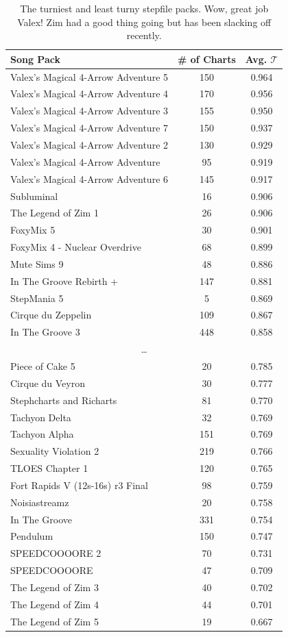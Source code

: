 \documentclass[10pt]{sigplanconf}
\begin{document}
\begin{table}[t]
	\begin{center}
		\small
	\begin{tabular}{l|c|c}
		Song Pack & \# of Charts & Avg. $\mathcal{T}$ \\
		\hline
		Valex's Magical 4-Arrow Adventure 5 & 150 & 0.964 \\
		Valex's Magical 4-Arrow Adventure 4 & 170 & 0.956 \\
		Valex's Magical 4-Arrow Adventure 3 & 155 & 0.950 \\
		Valex's Magical 4-Arrow Adventure 7 & 150 & 0.937 \\
		Valex's Magical 4-Arrow Adventure 2 & 130 & 0.929 \\
		Valex's Magical 4-Arrow Adventure   & 95 & 0.919 \\
		Valex's Magical 4-Arrow Adventure 6 & 145 & 0.917 \\
		Subluminal & 16 & 0.906 \\
		The Legend of Zim 1 & 26 & 0.906 \\
		FoxyMix 5 & 30 & 0.901 \\
		FoxyMix 4 - Nuclear Overdrive & 68 & 0.899 \\ 
		Mute Sims 9 & 48 & 0.886 \\
		In The Groove Rebirth + & 147 & 0.881 \\
		StepMania 5 & 5 & 0.869 \\
		Cirque du Zeppelin & 109 & 0.867 \\
		In The Groove 3 & 448 & 0.858 \\
		\multicolumn{3}{c}{\normalsize\dots} \\
		Piece of Cake 5 & 20 & 0.785 \\
		Cirque du Veyron & 30 & 0.777 \\
		Stephcharts and Richarts & 81 & 0.770 \\
		Tachyon Delta & 32 & 0.769 \\
		Tachyon Alpha & 151 & 0.769 \\
		Sexuality Violation 2 & 219 & 0.766 \\
		TLOES Chapter 1 & 120 & 0.765 \\
		Fort Rapids V (12s-16s) r3 Final & 98 & 0.759 \\
		Noisiastreamz & 20 & 0.758 \\
		In The Groove & 331 & 0.754 \\
		Pendulum & 150 & 0.747 \\
		SPEEDCOOOORE 2 & 70 & 0.731 \\
		SPEEDCOOOORE & 47 & 0.709 \\
		The Legend of Zim 3 & 40 & 0.702 \\
		The Legend of Zim 4 & 44 & 0.701 \\
		The Legend of Zim 5 & 19 & 0.667 \\
	\end{tabular}
	\end{center}
	\caption{The turniest and least turny stepfile packs. Wow, great job Valex! Zim had a good thing going but has been slacking off recently.}
	\label{tab:pack}
\end{table}
\end{document}
